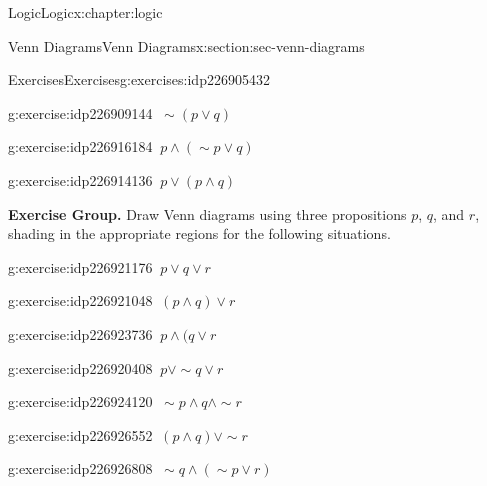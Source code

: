 \documentclass[twoside,10pt,]{book}
\numberwithin{equation}{section}
\begin{document}
\begin{chapterptx}{Logic}{}{Logic}{}{}{x:chapter:logic}
\begin{sectionptx}{Venn Diagrams}{}{Venn Diagrams}{}{}{x:section:sec-venn-diagrams}
\begin{exercises-subsection}{Exercises}{}{Exercises}{}{}{g:exercises:idp226905432}
\begin{exercisegroup}
\begin{divisionexerciseeg}{5}{}{}{g:exercise:idp226909144}%
\(\ \sim\!(p{\vee} q)\)\end{divisionexerciseeg}%
\begin{divisionexerciseeg}{6}{}{}{g:exercise:idp226916184}%
\(\ p{\wedge}(\sim\!{p}{\vee} q)\)\end{divisionexerciseeg}%
\begin{divisionexerciseeg}{7}{}{}{g:exercise:idp226914136}%
\(\ p{\vee}(p{\wedge} q)\)\end{divisionexerciseeg}%
\end{exercisegroup}
\par\medskip\noindent
\par\medskip\noindent%
\textbf{Exercise Group.}\space\space%
Draw Venn diagrams using three propositions \(p\), \(q\), and \(r\), shading in the appropriate regions for the following situations.\begin{exercisegroup}
\begin{divisionexerciseeg}{8}{}{}{g:exercise:idp226921176}%
\(\ p{\vee} q{\vee} r\)\end{divisionexerciseeg}%
\begin{divisionexerciseeg}{9}{}{}{g:exercise:idp226921048}%
\(\ (p{\wedge} q){\vee} r\)\end{divisionexerciseeg}%
\begin{divisionexerciseeg}{10}{}{}{g:exercise:idp226923736}%
\(\ p{\wedge} (q{\vee} r\)\end{divisionexerciseeg}%
\begin{divisionexerciseeg}{11}{}{}{g:exercise:idp226920408}%
\(\ p{\vee}\sim\!{q}{\vee} r\)\end{divisionexerciseeg}%
\begin{divisionexerciseeg}{12}{}{}{g:exercise:idp226924120}%
\(\ \sim\!{p}{\wedge} q{\wedge}\sim\!{r}\)\end{divisionexerciseeg}%
\begin{divisionexerciseeg}{13}{}{}{g:exercise:idp226926552}%
\(\ (p{\wedge} q){\vee}\sim\!{r}\)\end{divisionexerciseeg}%
\begin{divisionexerciseeg}{14}{}{}{g:exercise:idp226926808}%
\(\ \sim\!{q}{\wedge}(\sim\!{p}{\vee} r)\)\end{divisionexerciseeg}%
\end{exercisegroup}
\par\medskip\noindent
\end{exercises-subsection}
%
%
\typeout{************************************************}

\end{sectionptx}
\end{chapterptx}
\end{document}
